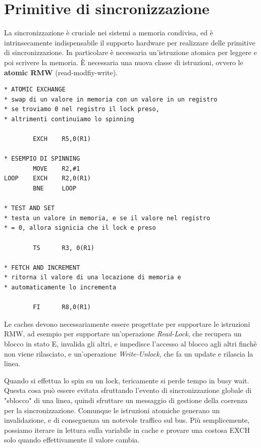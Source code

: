 \section{Primitive di sincronizzazione}
La sincronizzazione è cruciale nei sistemi a memoria condivisa, ed è intrinsecamente indispensabile il supporto hardware per realizzare delle primitive di sincronizzazione. In particolare è necessaria un'istruzione atomica per leggere e poi scrivere la memoria. \uppercase{è} necessaria una nuova classe di istruzioni, ovvero le \textbf{atomic RMW} (read-modfiy-write).

\begin{lstlisting}[language={RISCAsm}]
* ATOMIC EXCHANGE 
* swap di un valore in memoria con un valore in un registro 
* se troviamo 0 nel registro il lock preso, 
* altrimenti continuiamo lo spinning

        EXCH    R5,0(R1)

* ESEMPIO DI SPINNING 
        MOVE    R2,#1 
LOOP    EXCH    R2,0(R1)
        BNE     LOOP 

* TEST AND SET 
* testa un valore in memoria, e se il valore nel registro 
* = 0, allora signicia che il lock e preso 

        TS      R3, 0(R1)

* FETCH AND INCREMENT 
* ritorna il valore di una locazione di memoria e  
* automaticamente lo incrementa 

        FI      R8,0(R1)

\end{lstlisting}

\noindent Le caches devono necessariamente essere progettate per supportare le istruzioni RMW, ad esempio per supportare un'operazione \textit{Read-Lock}, che recupera un blocco in stato E, invalida gli altri, e impedisce l'accesso al blocco agli altri finchè non viene rilasciato, e un'operazione \textit{Write-Unlock}, che fa un update e rilascia la linea. 

\begin{info}
    Quando si effettua lo spin su un lock, tericamente si perde tempo in busy wait. Questa cosa può essere evitata sfruttando l'evento di sincronizzazione globale di "sblocco" di una linea, quindi sfruttare un messaggio di gestione della coerenza per la sincronizzazione. Comunque le istruzioni atomiche generano un invalidazione, e di conseguenza un notevole traffico sul bus. Più semplicemente, possiamo iterare in lettura sulla variabile in cache e provare una costosa EXCH solo quando effettivamente il valore cambia. 
\end{info}

